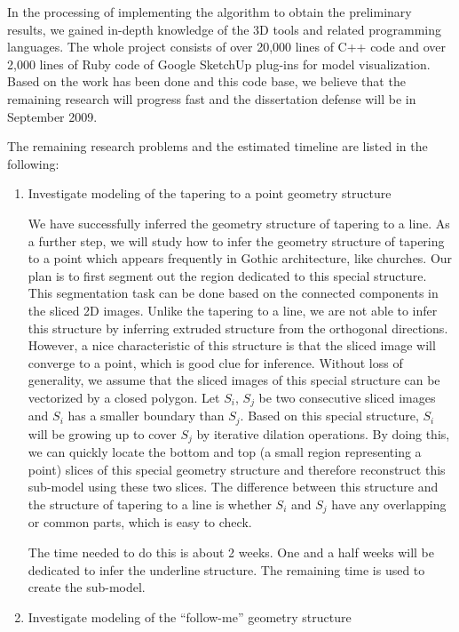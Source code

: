 \documentclass[12pt,letterpaper]{article}
\begin{document}
In the processing of implementing the algorithm to obtain the preliminary results, we gained in-depth
knowledge of the 3D tools and related programming languages. The whole project consists of over 20,000
lines of C++ code and over 2,000 lines of Ruby code of Google SketchUp plug-ins for model visualization.
Based on the work has been done and this code base, we believe that the remaining research will
progress fast and the dissertation defense will be in September 2009.

The remaining research problems and the estimated timeline are listed in the following:
\begin{enumerate}

\item Investigate modeling of the tapering to a point geometry structure

We have successfully inferred the geometry structure of tapering to a line. As a further step, we will study
how to infer the geometry structure of tapering to a point which appears frequently in Gothic architecture,
like churches.
Our plan is to first segment out the region dedicated to this special structure.
This segmentation task can be done based on the connected components in the sliced 2D images.
Unlike the tapering to a line, we are not able to infer this structure by inferring extruded
structure from the orthogonal directions.
However, a nice characteristic of this structure is that
the sliced image will converge to a point, which is good clue for inference.
Without loss of generality, we assume that the sliced images of this special structure
can be vectorized by a closed polygon.
Let $S_i$, $S_j$ be two consecutive sliced images and $S_i$
has a smaller boundary than $S_j$. Based on this special structure, $S_i$ will be growing up
to cover $S_j$ by iterative dilation operations. By doing this, we can quickly locate the
bottom and top (a small region representing a point) slices of this special geometry
structure and therefore reconstruct this sub-model using these two slices.
The difference between this structure and the structure of tapering to a line is whether
$S_i$ and $S_j$ have any overlapping or common parts, which is easy to check.

The time needed to do this is about 2 weeks.
One and a half weeks will be dedicated to infer the underline structure.
The remaining time is used to create the sub-model.

\item Investigate modeling of the ``follow-me'' geometry structure


\end{enumerate}
\end{document}

